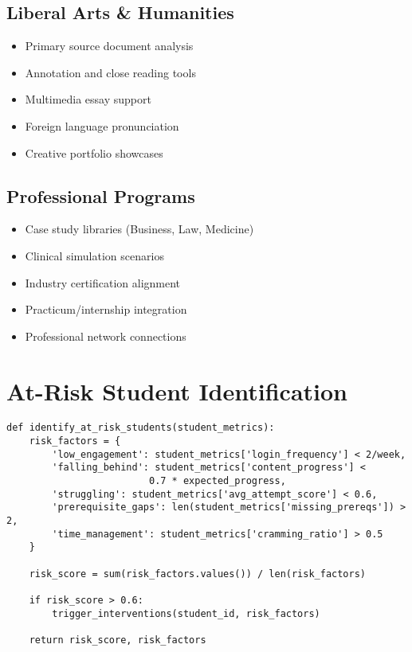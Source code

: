 \documentclass[11pt,a4paper]{report}
\begin{document}
\subsection{Liberal Arts \& Humanities}
\begin{itemize}
    \item Primary source document analysis
    \item Annotation and close reading tools
    \item Multimedia essay support
    \item Foreign language pronunciation
    \item Creative portfolio showcases
\end{itemize}

\subsection{Professional Programs}
\begin{itemize}
    \item Case study libraries (Business, Law, Medicine)
    \item Clinical simulation scenarios
    \item Industry certification alignment
    \item Practicum/internship integration
    \item Professional network connections
\end{itemize}

\section{At-Risk Student Identification}

\begin{lstlisting}[caption={At-Risk Student Detection Algorithm},label={lst:atrisk}]
def identify_at_risk_students(student_metrics):
    risk_factors = {
        'low_engagement': student_metrics['login_frequency'] < 2/week,
        'falling_behind': student_metrics['content_progress'] < 
                         0.7 * expected_progress,
        'struggling': student_metrics['avg_attempt_score'] < 0.6,
        'prerequisite_gaps': len(student_metrics['missing_prereqs']) > 2,
        'time_management': student_metrics['cramming_ratio'] > 0.5
    }
    
    risk_score = sum(risk_factors.values()) / len(risk_factors)
    
    if risk_score > 0.6:
        trigger_interventions(student_id, risk_factors)
    
    return risk_score, risk_factors
\end{lstlisting}
\end{document}
